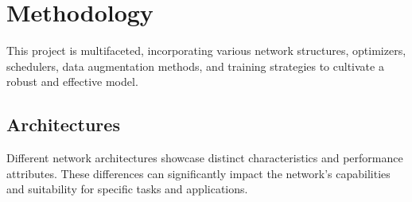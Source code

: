 \documentclass[10pt,twocolumn,letterpaper]{article}
\begin{document}
\section{Methodology}
\label{sec:method}
This project is multifaceted, incorporating various network structures, optimizers, schedulers, data augmentation methods, and training strategies to cultivate a robust and effective model.

\subsection{Architectures}
\label{method:arch}
Different network architectures showcase distinct characteristics and performance attributes. These differences can significantly impact the network's capabilities and suitability for specific tasks and applications.
\end{document}

